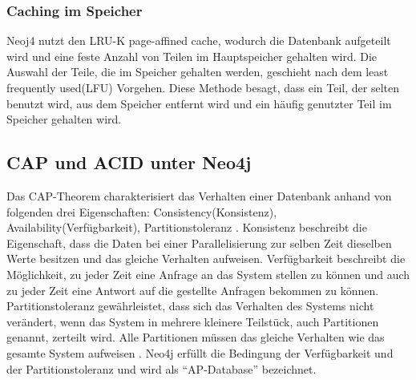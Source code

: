 \subsubsection{Caching im Speicher}
Neoj4 nutzt den LRU-K page-affined cache, wodurch die Datenbank aufgeteilt wird und eine feste Anzahl von Teilen im Hauptspeicher gehalten wird. Die Auswahl der Teile, die im Speicher gehalten werden, geschieht nach dem least frequently used(LFU) Vorgehen. Diese Methode besagt, dass ein Teil, der selten benutzt wird, aus dem Speicher entfernt wird und ein häufig genutzter Teil im Speicher gehalten wird\parencite{robinson2013graph}.
\subsection{CAP und ACID unter Neo4j}
Das CAP-Theorem charakterisiert das Verhalten einer Datenbank anhand von folgenden drei Eigenschaften: Consistency(Konsistenz), Availability(Verfügbarkeit), Partitionstoleranz \parencite{simon2000brewer}. Konsistenz beschreibt die Eigenschaft, dass die Daten bei einer Parallelisierung zur selben Zeit dieselben Werte besitzen und das gleiche Verhalten aufweisen. Verfügbarkeit beschreibt die Möglichkeit, zu jeder Zeit eine Anfrage an das System stellen zu können und auch zu jeder Zeit eine Antwort auf die gestellte Anfragen bekommen zu können. Partitionstoleranz gewährleistet, dass sich das Verhalten des Systems nicht verändert, wenn das System in mehrere kleinere Teilstück, auch  Partitionen genannt, zerteilt wird. Alle Partitionen müssen das gleiche Verhalten wie das gesamte System aufweisen \parencite{simon2000brewer}. Neo4j erfüllt die Bedingung der Verfügbarkeit und der  Partitionstoleranz \parencite{vukotic2015neo4j} und wird als “AP-Database” bezeichnet. \newline
